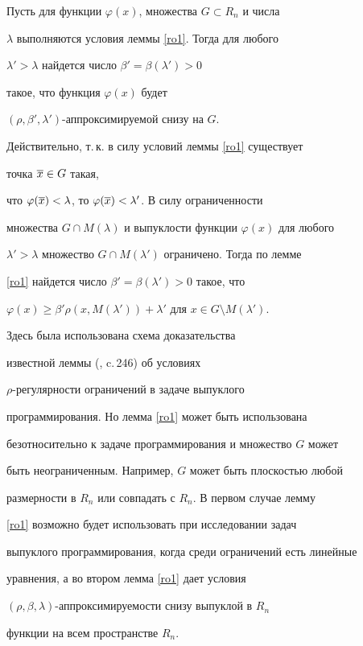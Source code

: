 \begin{cornonum}


Пусть для функции $\varphi(x)$, множества $G\subset R_n$ и числа


$\lambda$ выполняются условия леммы \ref{ro1}. Тогда для любого


$\lambda'>\lambda$ найдется число $\beta'=\beta(\lambda')>0$


такое, что функция $\varphi(x)$ будет


$(\rho,\beta',\lambda')$-аппроксимируемой снизу на $G$.


\end{cornonum}





\begin{pf}


Действительно, т.\,к. в силу условий леммы \ref{ro1} существует 


точка $\overline x\in G$ такая,


что $\varphi(\overline x)<\lambda$, то $\varphi(\overline x)<\lambda'$. В силу ограниченности


множества $G\cap M(\lambda)$ и выпуклости функции $\varphi(x)$ для любого


$\lambda'>\lambda$ множество $G\cap M(\lambda')$ ограничено. Тогда по лемме


\ref{ro1} найдется число $\beta'=\beta(\lambda')>0$ такое, что


$\varphi(x)\geq\beta'\rho(x,M(\lambda'))+\lambda'$ для $x\in G\setminus


M(\lambda')$.


\end{pf}





\begin{notenonum}


Здесь была использована схема доказательства


известной леммы (\cite{STF}, c.\,246) об условиях


$\rho$-регулярности ограничений в задаче выпуклого


программирования. Но лемма \ref{ro1} может быть использована


безотносительно к задаче программирования и множество $G$ может


быть неограниченным. Например, $G$ может быть плоскостью любой


размерности в $R_n$ или совпадать с $R_n$. В первом случае лемму


\ref{ro1} возможно будет использовать при исследовании задач


выпуклого программирования, когда среди ограничений есть линейные


уравнения, а во втором лемма \ref{ro1} дает условия


$(\rho,\beta,\lambda)$-аппроксимируемости снизу выпуклой в $R_n$


функции на всем пространстве $R_n$.


\end{notenonum}





